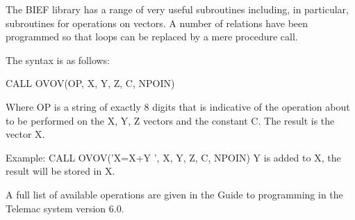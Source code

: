  The BIEF library has a range of very useful subroutines including, in particular, subroutines for operations on vectors. A number of relations have been programmed so that loops can be replaced by a mere procedure call.

 The syntax is as follows:

 CALL OVOV(OP, X, Y, Z, C, NPOIN)

 Where OP is a string of exactly 8 digits that is indicative of the operation about to be performed on the X, Y, Z vectors and the constant C. The result is the vector X.

 Example:  CALL OVOV('X=X+Y ', X, Y, Z, C, NPOIN)  Y is added to X, the result will be stored in X.

 A full list of available operations are given in the Guide to programming in the Telemac system version 6.0.

